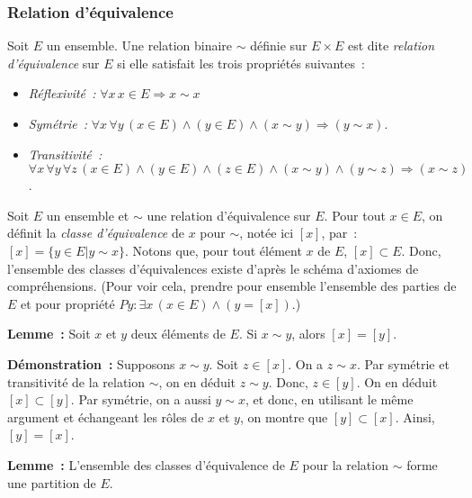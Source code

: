\subsubsection{Relation d'équivalence}

Soit $E$ un ensemble. 
Une relation binaire $\sim$ définie sur $E \times E$ est dite \textit{relation d'équivalence} sur $E$ si elle satisfait les trois propriétés suivantes : 
\begin{itemize}[nosep]
    \item \textit{Réflexivité :} $\forall x \, x \in E \Rightarrow x \sim x$
    \item \textit{Symétrie :} $\forall x \, \forall y \, (x \in E) \wedge (y \in E) \wedge (x \sim y) \Rightarrow (y \sim x)$.
    \item \textit{Transitivité :} $\forall x \, \forall y \, \forall z \, (x \in E) \wedge (y \in E) \wedge (z \in E) \wedge (x \sim y) \wedge (y \sim z) \Rightarrow (x \sim z)$. 
\end{itemize}

Soit $E$ un ensemble et $\sim$ une relation d'équivalence sur $E$. 
Pour tout $x \in E$, on définit la \textit{classe d'équivalence} de $x$ pour $\sim$, notée ici $[x]$, par : $[x] = \lbrace y \in E \vert y \sim x \rbrace$. 
Notons que, pour tout élément $x$ de $E$, $[x] \subset E$. 
Donc, l'ensemble des classes d'équivalences existe d'après le schéma d'axiomes de compréhensions. 
(Pour voir cela, prendre pour ensemble l'ensemble des parties de $E$ et pour propriété $P y: \exists x \, (x \in E) \wedge (y = [x])$.)

\medskip

\noindent \textbf{Lemme :} Soit $x$ et $y$ deux éléments de $E$. Si $x \sim y$, alors $[x] = [y]$. 

\medskip

\noindent \textbf{Démonstration :} 
    Supposons $x \sim y$. Soit $z \in [x]$. On a $z \sim x$. Par symétrie et transitivité de la relation $\sim$, on en déduit $z \sim y$. Donc, $z \in [y]$. 
    On en déduit $[x] \subset [y]$.
    Par symétrie, on a aussi $y \sim x$, et donc, en utilisant le même argument et échangeant les rôles de $x$ et $y$, on montre que $[y] \subset [x]$. 
    Ainsi, $[y] = [x]$.

\done

\medskip

\noindent \textbf{Lemme :} L'ensemble des classes d'équivalence de $E$ pour la relation $\sim$ forme une partition de $E$.

\medskip

